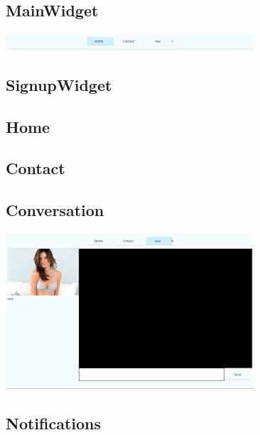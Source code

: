 \documentclass{article}
\begin{document}
\subsection{MainWidget}
  \includegraphics[width=350]{TabsBabel}
  \newpage
\subsection{SignupWidget}
\subsection{Home}
\subsection{Contact}
\subsection{Conversation}
  \includegraphics[width=350]{ConversationWidget}
\subsection{Notifications}
\end{document}
